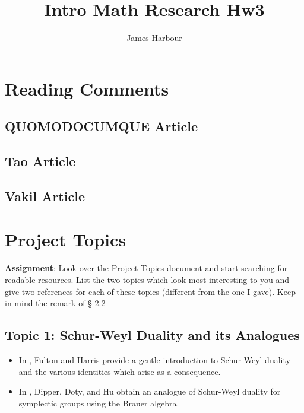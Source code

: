 \documentclass[12pt]{article}
\title{Intro Math Research Hw3}
\author{James Harbour}
\begin{document}
\maketitle
\tableofcontents


\section{Reading Comments}

\subsection*{QUOMODOCUMQUE Article}


\subsection*{Tao Article}


\subsection*{Vakil Article}


\newpage



\section{Project Topics}
\textbf{Assignment}: Look over the Project Topics document and start searching for readable
resources. List the two topics which look most interesting to you and
give two references for each of these topics (different from the one I gave).
Keep in mind the remark of § 2.2

\subsection*{Topic 1: Schur-Weyl Duality and its Analogues}
\begin{itemize}
  \item In \cite[Ch.4,6]{fultonharris}, Fulton and Harris provide a gentle introduction to Schur-Weyl duality and the various identities which arise as a consequence.
  \item In \cite{dipper:05}, Dipper, Doty, and Hu obtain an analogue of Schur-Weyl duality for symplectic groups using the Brauer algebra. 

\end{itemize}
\end{document}
